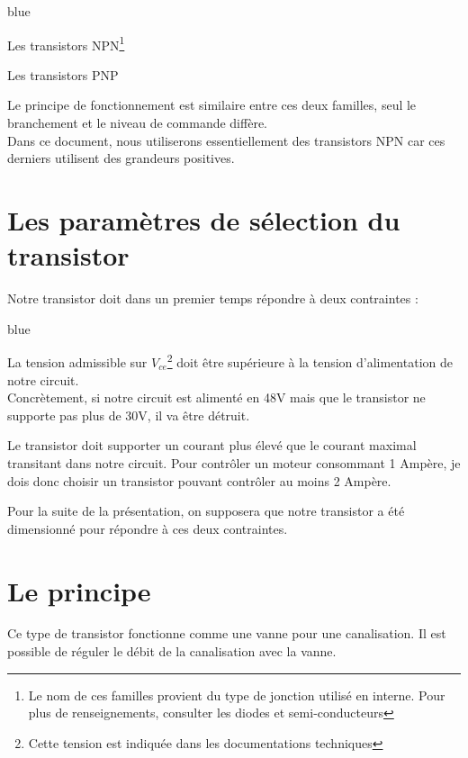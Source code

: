 \begin{items}{blue}{\Triangle}

  \item Les transistors NPN\footnote{Le nom de ces familles provient du type de jonction utilisé en interne. Pour plus de renseignements, consulter les diodes et semi-conducteurs}
  \item Les transistors PNP

\end{items}

Le principe de fonctionnement est similaire entre ces deux familles, seul le branchement et le niveau de commande diffère.\\ Dans ce document, nous utiliserons essentiellement des transistors NPN car ces derniers utilisent des grandeurs positives.



\section{Les paramètres de sélection du transistor}

Notre transistor doit dans un premier temps répondre à deux contraintes : 

\begin{items}{blue}{\Triangle}

  \item La tension admissible sur $V_{ce}$\footnote{Cette tension est indiquée dans les documentations techniques} doit être supérieure à la tension d'alimentation de notre circuit.\\
  Concrètement, si notre circuit est alimenté en 48V mais que le transistor ne supporte pas plus de 30V, il va être détruit.
  \item Le transistor doit supporter un courant plus élevé que le courant maximal transitant dans notre circuit.
  Pour contrôler un moteur consommant 1 Ampère, je dois donc choisir un transistor pouvant contrôler au moins 2 Ampère.
\end{items}

Pour la suite de la présentation, on supposera que notre transistor a été dimensionné pour répondre à ces deux contraintes.


\section{Le principe}

Ce type de transistor fonctionne comme une vanne pour une canalisation. Il est possible de réguler le débit de la canalisation avec la vanne.\\

